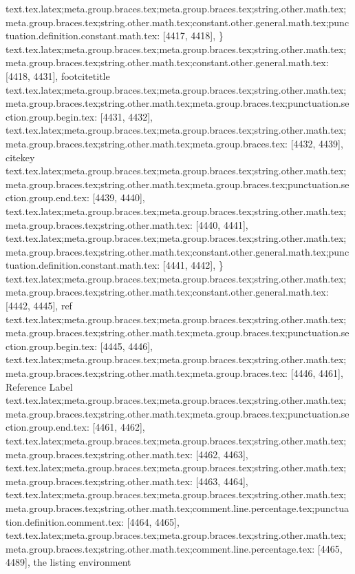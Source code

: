 {{{{{{{{{{{{{{{{{{{{{{{{{{{{{{{{{{{{{{{{{{{{{{{{{{{{{{{{{{{{{{{{{{{{{{{{{{{{{{{{{{{{{{{{{{{{{{{{{{{{{{{{{{{{{{{{{{{{{{{{{{{{{{{{{{{{{{{{{{{{}
text.tex.latex;meta.group.braces.tex;meta.group.braces.tex;string.other.math.tex;meta.group.braces.tex;string.other.math.tex;constant.other.general.math.tex;punctuation.definition.constant.math.tex: [4417, 4418], {\}
text.tex.latex;meta.group.braces.tex;meta.group.braces.tex;string.other.math.tex;meta.group.braces.tex;string.other.math.tex;constant.other.general.math.tex: [4418, 4431], {footcitetitle}
text.tex.latex;meta.group.braces.tex;meta.group.braces.tex;string.other.math.tex;meta.group.braces.tex;string.other.math.tex;meta.group.braces.tex;punctuation.section.group.begin.tex: [4431, 4432], {{}
text.tex.latex;meta.group.braces.tex;meta.group.braces.tex;string.other.math.tex;meta.group.braces.tex;string.other.math.tex;meta.group.braces.tex: [4432, 4439], {citekey}
text.tex.latex;meta.group.braces.tex;meta.group.braces.tex;string.other.math.tex;meta.group.braces.tex;string.other.math.tex;meta.group.braces.tex;punctuation.section.group.end.tex: [4439, 4440], {}}
text.tex.latex;meta.group.braces.tex;meta.group.braces.tex;string.other.math.tex;meta.group.braces.tex;string.other.math.tex: [4440, 4441], {
}
text.tex.latex;meta.group.braces.tex;meta.group.braces.tex;string.other.math.tex;meta.group.braces.tex;string.other.math.tex;constant.other.general.math.tex;punctuation.definition.constant.math.tex: [4441, 4442], {\}
text.tex.latex;meta.group.braces.tex;meta.group.braces.tex;string.other.math.tex;meta.group.braces.tex;string.other.math.tex;constant.other.general.math.tex: [4442, 4445], {ref}
text.tex.latex;meta.group.braces.tex;meta.group.braces.tex;string.other.math.tex;meta.group.braces.tex;string.other.math.tex;meta.group.braces.tex;punctuation.section.group.begin.tex: [4445, 4446], {{}
text.tex.latex;meta.group.braces.tex;meta.group.braces.tex;string.other.math.tex;meta.group.braces.tex;string.other.math.tex;meta.group.braces.tex: [4446, 4461], {Reference Label}
text.tex.latex;meta.group.braces.tex;meta.group.braces.tex;string.other.math.tex;meta.group.braces.tex;string.other.math.tex;meta.group.braces.tex;punctuation.section.group.end.tex: [4461, 4462], {}}
text.tex.latex;meta.group.braces.tex;meta.group.braces.tex;string.other.math.tex;meta.group.braces.tex;string.other.math.tex: [4462, 4463], {
}
text.tex.latex;meta.group.braces.tex;meta.group.braces.tex;string.other.math.tex;meta.group.braces.tex;string.other.math.tex: [4463, 4464], {
}
text.tex.latex;meta.group.braces.tex;meta.group.braces.tex;string.other.math.tex;meta.group.braces.tex;string.other.math.tex;comment.line.percentage.tex;punctuation.definition.comment.tex: [4464, 4465], {%
text.tex.latex;meta.group.braces.tex;meta.group.braces.tex;string.other.math.tex;meta.group.braces.tex;string.other.math.tex;comment.line.percentage.tex: [4465, 4489], { the listing environment}
}}}}}}}}}}}}}}}}}}}}}}}}}}}}}}}}}}}}}}}}}}}}}}}}}}}}}}}}}}}}}}}}}}}}}}}}}}}}}}}}}}}}}}}}}}}}}}}}}}}}}}}}}}}}}}}}}}}}}}}}}}}}}}}}}}}}}}}}}}}}}}
